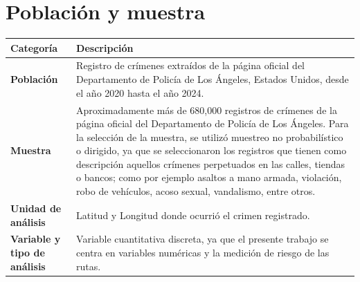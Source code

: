 \section{Población y muestra}
\medskip
\begin{table}[h!]
	\centering
	\begin{tabular}{|m{4cm}|m{10cm}|}
		\hline
		\textbf{Categoría} & \textbf{Descripción} \\
		\hline
		\textbf{Población} & Registro de crímenes extraídos de la página oficial del Departamento de Policía de Los Ángeles, Estados Unidos, desde el año 2020 hasta el año 2024. \\
		\hline
		\textbf{Muestra} & Aproximadamente más de 680,000 registros de crímenes de la página oficial del Departamento de Policía de Los Ángeles. Para la selección de la muestra, se utilizó muestreo no probabilístico o dirigido, ya que se seleccionaron los registros que tienen como descripción aquellos crímenes perpetuados en las calles, tiendas o bancos; como por ejemplo asaltos a mano armada, violación, robo de vehículos, acoso sexual, vandalismo, entre otros. \\
		\hline
		\textbf{Unidad de análisis} & Latitud y Longitud donde ocurrió el crimen registrado. \\
		\hline
		\textbf{Variable y tipo de análisis} & Variable cuantitativa discreta, ya que el presente trabajo se centra en variables numéricas y la medición de riesgo de las rutas. \\
		\hline
	\end{tabular}
\end{table}
\medskip

